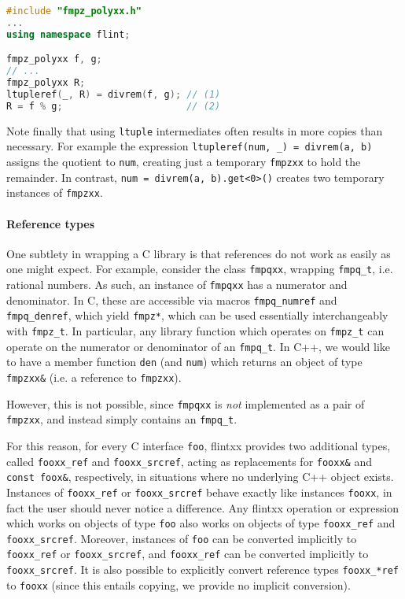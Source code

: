 \documentclass[a4paper,10pt]{book}
\newcommand{\code}{\lstinline}
\begin{document}
{{\begin{lstlisting}[language=c++]
#include "fmpz_polyxx.h"
...
using namespace flint;

fmpz_polyxx f, g;
// ...
fmpz_polyxx R;
ltupleref(_, R) = divrem(f, g); // (1)
R = f % g;                      // (2)
\end{lstlisting}

Note finally that using \code{ltuple} intermediates often results in more copies
than necessary. For example the expression
\code{ltupleref(num, _) = divrem(a, b)} assigns the quotient to \code{num},
creating just a temporary \code{fmpzxx} to hold the remainder. In contrast,
\code{num = divrem(a, b).get<0>()} creates two temporary instances of
\code{fmpzxx}.

\paragraph{Reference types}

One subtlety in wrapping a C library is that references do not work as easily as
one might expect. For example, consider the class \code{fmpqxx}, wrapping
\code{fmpq_t}, i.e. rational numbers. As such, an instance of \code{fmpqxx} has a
numerator and denominator. In C, these are accessible via macros
\code{fmpq_numref} and \code{fmpq_denref}, which yield \code{fmpz*}, which can
be used essentially interchangeably with \code{fmpz_t}. In particular, any
library function which operates on \code{fmpz_t} can operate on the numerator or
denominator of an \code{fmpq_t}. In C++, we would like to have a member function
\code{den} (and \code{num}) which returns an object of type \code{fmpzxx&} (i.e.
a reference to \code{fmpzxx}).

However, this is not possible, since \code{fmpqxx} is \emph{not} implemented as
a pair of \code{fmpzxx}, and instead simply contains an \code{fmpq_t}.

For this reason, for every C interface \code{foo}, flintxx provides two
additional types, called \code{fooxx_ref} and \code{fooxx_srcref}, acting as
replacements for \code{fooxx&} and \code{const foox&}, respectively, in
situations where no underlying C++ object exists. Instances
of \code{fooxx_ref} or \code{fooxx_srcref} behave exactly like instances
\code{fooxx}, in fact the user should never notice a difference. Any flintxx
operation or expression which works on objects of type \code{foo} also works on
objects of type \code{fooxx_ref} and \code{fooxx_srcref}. Moreover, instances
of \code{foo} can be converted implicitly to \code{fooxx_ref} or
\code{fooxx_srcref}, and \code{fooxx_ref} can be converted implicitly to
\code{fooxx_srcref}. It is also possible to explicitly convert reference types
\code{fooxx_*ref} to \code{fooxx} (since this entails copying, we provide no
implicit conversion).

}}
\end{document}
